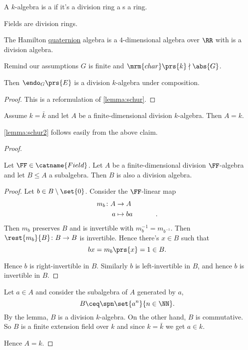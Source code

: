 \documentclass[10pt,a4paper,twoside,openany,hidelinks]{book}
\begin{document}
\begin{definition}
A $k$-algebra is a  if it's a division ring a s a ring.
\end{definition}

\begin{example}
\item Fields are division rings.

\item The Hamilton \href{https://en.wikipedia.org/wiki/Quaternion}{quaternion} algebra is a $4$-dimensional algebra over $\RR$ with is a division algebra. 
\end{example}

\begin{lemma}[Schur] \label{lemma:schur3}
Remind our assumptions $G$ is finite and $\mrm{char}\prs{k} \nmid \abs{G}$.

Then $\endo_G\prs{E}$ is a division $k$-algebra under composition.
\end{lemma}

\begin{proof}
This is a reformulation of \ref{lemma:schur}.
\end{proof}

\begin{claim}
Assume $k = \bar{k}$ and let $A$ be a finite-dimensional division $k$-algebra. Then $A = k$.
\end{claim}

\begin{remark}
\ref{lemma:schur2} follows easily from the above claim.
\end{remark}

\begin{proof}
\begin{lemma}
Let $\FF \in \catname{Field}$.
Let $A$ be a finite-dimensional division $\FF$-algebra and let $B \leq A$ a subalgebra. Then $B$ is also a division algebra.
\end{lemma}
\begin{proof}
Let $b \in B \setminus \set{0}$. Consider the $\FF$-linear map
\begin{align*}
m_b \colon A &\to A \\
a &\mapsto ba \hphantom{lalalala} \text{.}
\end{align*}
Then $m_b$ preserves $B$ and is invertible with $m_b^{-1} = m_{b^{-1}}$.
Then
$\rest{m_b}{B} \colon B \to B$ is invertible.
Hence there's $x \in B$ such that \[bx = m_b\prs{x} = 1 \in B \text{.}\]

Hence $b$ is right-invertible in $B$.
Similarly $b$ is left-invertible in $B$, and hence $b$ is invertible in $B$.
\end{proof}

Let $a \in A$ and consider the subalgebra of $A$ generated by $a$,
\[B \ceq \spn \set{a^n}{n \in \NN} \text{.}\]
By the lemma, $B$ is a division $k$-algebra.
On the other hand, $B$ is commutative. So $B$ is a finite extension field over $k$ and since $k = \bar{k}$ we get $a \in k$.

Hence $A = k$.
\end{proof}
\end{document}

